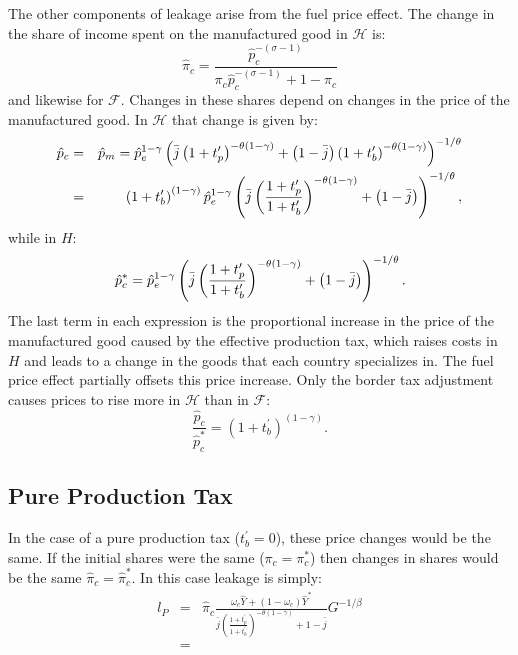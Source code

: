 \documentclass[notitlepage,12pt]{article}
\begin{document}
The other components of leakage arise from the fuel price effect. The change
in the share of income spent on the manufactured good in $\mathcal{H}$ is:%
\begin{equation*}
\hat{\pi}_{c}=\frac{\hat{p}_{c}^{-\left( \sigma -1\right) }}{\pi _{c}\hat{p}%
_{c}^{-\left( \sigma -1\right) }+1-\pi _{c}}
\end{equation*}%
and likewise for $\mathcal{F}$. Changes in these shares depend on changes in
the price of the manufactured good. In $\mathcal{H}$ that change is given by:%
\begin{eqnarray*}
\hat{p}_{c} &=&\hat{p}_{m}=\hat{p}_{e}^{1-\gamma }\left( \bar{j}\left(
1+t_{p}^{\prime }\right) ^{-\theta \left( 1-\gamma \right) }+\left( 1-\bar{j}%
\right) \left( 1+t_{b}^{\prime }\right) ^{-\theta \left( 1-\gamma \right)
}\right) ^{-1/\theta } \\
&=&\left( 1+t_{b}^{\prime }\right) ^{\left( 1-\gamma \right) }\hat{p}%
_{e}^{1-\gamma }\left( \bar{j}\left( \frac{1+t_{p}^{\prime }}{%
1+t_{b}^{\prime }}\right) ^{-\theta \left( 1-\gamma \right) }+\left( 1-\bar{j%
}\right) \right) ^{-1/\theta },
\end{eqnarray*}%
while in $H$:%
\begin{equation*}
\hat{p}_{c}^{\ast }=\hat{p}_{e}^{1-\gamma }\left( \bar{j}\left( \frac{%
1+t_{p}^{\prime }}{1+t_{b}^{\prime }}\right) ^{-\theta \left( 1-\gamma
\right) }+\left( 1-\bar{j}\right) \right) ^{-1/\theta }.
\end{equation*}%
The last term in each expression is the proportional increase in the price
of the manufactured good caused by the effective production tax, which
raises costs in $H$ and leads to a change in the goods that each country
specializes in. The fuel price effect partially offsets this price increase.
Only the border tax adjustment causes prices to rise more in $\mathcal{H}$
than in $\mathcal{F}$:%
\begin{equation*}
\frac{\hat{p}_{c}}{\hat{p}_{c}^{\ast }}=\left( 1+t_{b}^{\prime }\right)
^{\left( 1-\gamma \right) }.
\end{equation*}

\subsection{Pure Production Tax}

In the case of a pure production tax ($t_{b}^{\prime }=0$), these price
changes would be the same. If the initial shares were the same ($\pi
_{c}=\pi _{c}^{\ast }$) then changes in shares would be the same $\hat{\pi}%
_{c}=\hat{\pi}_{c}^{\ast }$. In this case leakage is simply:%
\begin{eqnarray*}
l_{P} &=&\hat{\pi}_{c}\frac{\omega _{c}\hat{Y}+\left( 1-\omega _{c}\right) 
\hat{Y}^{\ast }}{\bar{j}\left( \frac{1+t_{p}^{\prime }}{1+t_{b}^{\prime }}%
\right) ^{-\theta \left( 1-\gamma \right) }+1-\bar{j}}G^{-1/\beta } \\
&=&
\end{eqnarray*}
\end{document}
